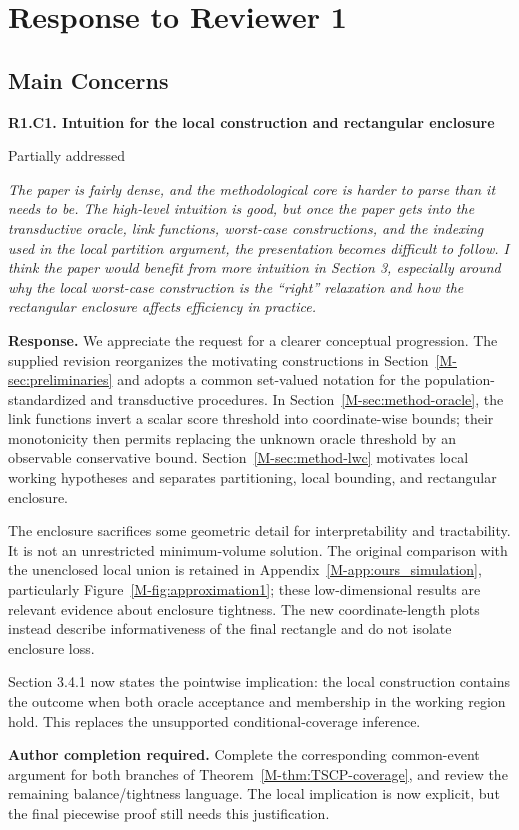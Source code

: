 \documentclass[11pt]{article}
\newcommand{\mssec}[1]{Section~\ref*{M-#1}}
\newcommand{\msapp}[1]{Appendix~\ref*{M-#1}}
\newcommand{\msfig}[1]{Figure~\ref*{M-#1}}
\newcommand{\action}[1]{\par{\small\color{ActionRed}\textbf{Author completion required.} #1\par}}
\newcommand{\point}[3]{\par\Needspace{7\baselineskip}\medskip
\noindent\parbox[t]{0.77\linewidth}{\textbf{#1}}\hfill
\parbox[t]{0.21\linewidth}{\raggedleft\small\sffamily #2}\par\nopagebreak
{\color{ReviewerBlue}\small\itshape #3\par}\textbf{Response.} }
\begin{document}
\clearpage
\section*{Response to Reviewer 1}
\subsection*{Main Concerns}

\point{R1.C1. Intuition for the local construction and rectangular enclosure}{Partially addressed}{The paper is fairly dense, and the methodological core is harder to parse
than it needs to be. The high-level intuition is good, but once the paper
gets into the transductive oracle, link functions, worst-case
constructions, and the indexing used in the local partition argument,
the presentation becomes difficult to follow. I think the paper would
benefit from more intuition in Section 3, especially around why the local
worst-case construction is the ``right'' relaxation and how the
rectangular enclosure affects efficiency in practice.}
\label{response:R1.C1}
We appreciate the request for a clearer conceptual progression. The supplied revision reorganizes the motivating constructions in \mssec{sec:preliminaries} and adopts a common set-valued notation for the population-standardized and transductive procedures. In \mssec{sec:method-oracle}, the link functions invert a scalar score threshold into coordinate-wise bounds; their monotonicity then permits replacing the unknown oracle threshold by an observable conservative bound. \mssec{sec:method-lwc} motivates local working hypotheses and separates partitioning, local bounding, and rectangular enclosure.

The enclosure sacrifices some geometric detail for interpretability and tractability. It is not an unrestricted minimum-volume solution. The original comparison with the unenclosed local union is retained in \msapp{app:ours_simulation}, particularly \msfig{fig:approximation1}; these low-dimensional results are relevant evidence about enclosure tightness. The new coordinate-length plots instead describe informativeness of the final rectangle and do not isolate enclosure loss.

Section 3.4.1 now states the pointwise implication: the local construction contains the outcome when both oracle acceptance and membership in the working region hold. This replaces the unsupported conditional-coverage inference.

\action{Complete the corresponding common-event argument for both branches of Theorem~\ref*{M-thm:TSCP-coverage}, and review the remaining balance/tightness language. The local implication is now explicit, but the final piecewise proof still needs this justification.}
\end{document}
